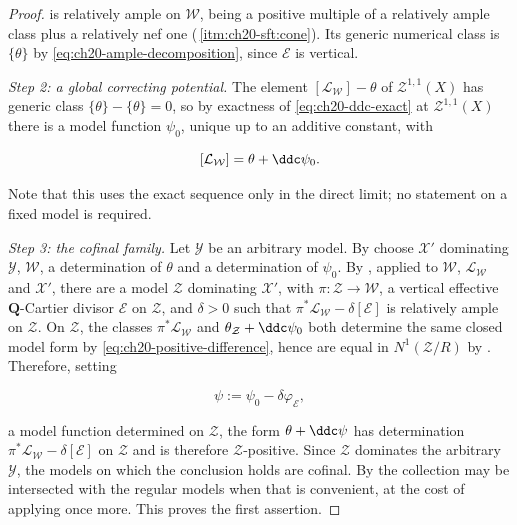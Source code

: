\begin{proof}
is relatively ample on \(\mathcal W\), being a positive multiple of a
relatively ample class plus a relatively nef one
(\,\cref{itm:ch20-sft:cone}).  Its generic
numerical class is \(\{\theta\}\) by
\eqref{eq:ch20-ample-decomposition}, since \(\mathcal E\) is vertical.

\emph{Step 2: a global correcting potential.}  The element
\([\mathcal L_{\mathcal W}]-\theta\) of \(\mathcal Z^{1,1}(X)\) has generic
class \(\{\theta\}-\{\theta\}=0\), so by exactness of
\eqref{eq:ch20-ddc-exact} at \(\mathcal Z^{1,1}(X)\) there is a model
function \(\psi_0\), unique up to an additive constant, with

\begin{equation}
\label{eq:ch20-positive-difference}
             [\mathcal L_{\mathcal W}]=\theta+\ddc\psi_0 .
\end{equation}

Note that this uses the exact sequence only in the direct limit; no
statement on a fixed model is required.

\emph{Step 3: the cofinal family.}  Let \(\mathcal Y\) be an arbitrary
model.  By  choose \(\mathcal X'\) dominating
\(\mathcal Y\), \(\mathcal W\), a determination of \(\theta\) and a
determination of \(\psi_0\).  By , applied
to \(\mathcal W\), \(\mathcal L_{\mathcal W}\) and \(\mathcal X'\), there
are a model \(\mathcal Z\) dominating \(\mathcal X'\), with
\(\pi:\mathcal Z\to\mathcal W\), a vertical effective
\(\mathbf Q\)-Cartier divisor \(\mathcal E\) on \(\mathcal Z\), and
\(\delta>0\) such that
\(\pi^*\mathcal L_{\mathcal W}-\delta[\mathcal E]\) is relatively ample on
\(\mathcal Z\).  On \(\mathcal Z\), the classes
\(\pi^*\mathcal L_{\mathcal W}\) and \(\theta_{\mathcal Z}+\ddc\psi_0\) both
determine the same closed model form by
\eqref{eq:ch20-positive-difference}, hence are equal in
\(N^1(\mathcal Z/R)\) by .  Therefore, setting

\[
 \psi:=\psi_0-\delta\varphi_{\mathcal E},
\]

a model function determined on \(\mathcal Z\), the form \(\theta+\ddc\psi\)
has determination \(\pi^*\mathcal L_{\mathcal W}-\delta[\mathcal E]\) on
\(\mathcal Z\) and is therefore \(\mathcal Z\)-positive.  Since
\(\mathcal Z\) dominates the arbitrary \(\mathcal Y\), the models on which
the conclusion holds are cofinal.  By  the collection
may be intersected with the regular models when that is convenient, at the
cost of applying
 once more.  This proves the first
assertion.


\end{proof}
